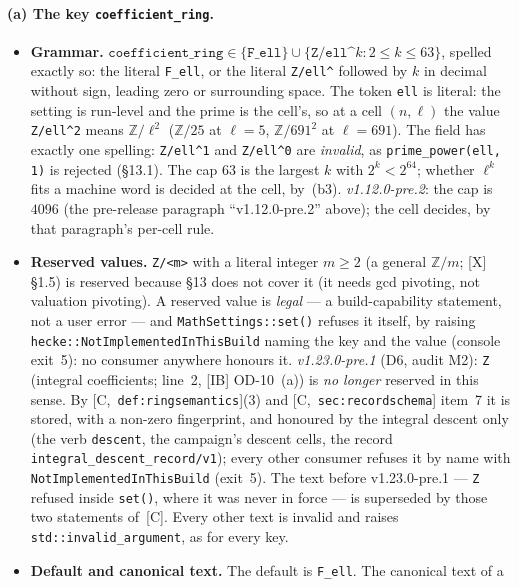 \documentclass[11pt]{article}
\theoremstyle{remark}
\newcommand{\Z}{\mathbb{Z}}
\newcommand{\HA}[1]{[C,~\texttt{#1}]}      %
\begin{document}
\paragraph{(a) The key \texttt{coefficient\_ring}.}
\begin{itemize}
\item \textbf{Grammar.} $\texttt{coefficient\_ring}\in\{\texttt{F\_ell}\}\cup\{\texttt{Z/ell\textasciicircum}k : 2\le k\le 63\}$,
  spelled exactly so: the literal \texttt{F\_ell}, or the literal \texttt{Z/ell\textasciicircum}
  followed by $k$ in decimal without sign, leading zero or surrounding space. The token
  \texttt{ell} is literal: the setting is run-level and the prime is the cell's, so at a cell
  $(n,\ell)$ the value \texttt{Z/ell\textasciicircum2} means $\Z/\ell^2$ ($\Z/25$ at $\ell=5$,
  $\Z/691^2$ at $\ell=691$). The field has exactly one spelling:
  \texttt{Z/ell\textasciicircum1} and \texttt{Z/ell\textasciicircum0} are \emph{invalid}, as
  \texttt{prime\_power(ell, 1)} is rejected (\S13.1). The cap $63$ is the largest $k$ with
  $2^k<2^{64}$; whether $\ell^k$ fits a machine word is decided at the cell, by~(b3). \emph{v1.12.0-pre.2}: the cap is $4096$ (the pre-release paragraph
  ``v1.12.0-pre.2'' above); the cell decides, by that paragraph's per-cell rule.
\item \textbf{Reserved values.} \texttt{Z/<m>} with a literal integer $m\ge2$ (a general $\Z/m$; [X] \S1.5) is reserved because
  \S13 does not cover it (it needs gcd pivoting, not valuation pivoting). A reserved value is
  \emph{legal} --- a build-capability statement, not a user error --- and
  \texttt{MathSettings::set()} refuses it itself, by raising
  \texttt{hecke::NotImplementedInThisBuild} naming the key and the value (console exit~5): no
  consumer anywhere honours it. \emph{v1.23.0-pre.1} (D6, audit M2): \texttt{Z} (integral
  coefficients; line~2, [IB] OD-10~(a)) is \emph{no longer} reserved in this sense. By \HA{def:ringsemantics}(3) and
  \HA{sec:recordschema} item~7 it is stored, with a non-zero fingerprint, and honoured by the
  integral descent only (the verb \texttt{descent}, the campaign's descent cells, the record
  \texttt{integral\_descent\_record/v1}); every other consumer refuses it by name with
  \texttt{NotImplementedInThisBuild} (exit~5). The text before v1.23.0-pre.1 --- \texttt{Z} refused inside
  \texttt{set()}, where it was never in force --- is superseded by those two statements of~[C]. Every other text is
  invalid and raises \texttt{std::invalid\_argument}, as for every key.
\item \textbf{Default and canonical text.} The default is \texttt{F\_ell}. The canonical text of a

\end{itemize}
\end{document}
